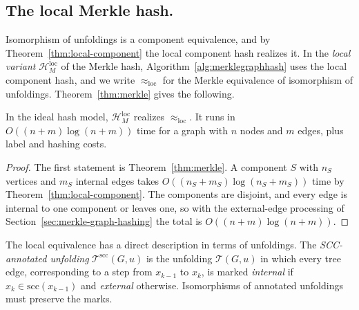 \documentclass[twoside,leqno]{article}
\newcommand{\HMl}{\mathcal{H}_{M}^{\mathrm{loc}}}
\newcommand{\eql}{\approx_{\mathrm{loc}}}
\newcommand{\UnfA}{\Unf^{\mathrm{scc}}}
\newcommand{\Scc}{\mathrm{scc}}
\newcommand{\Unf}{\mathcal{T}}
\begin{document}
\subsection{The local Merkle hash.}
\label{sec:local-merkle}
Isomorphism of unfoldings is a component equivalence, and by Theorem~\ref{thm:local-component} the local component hash realizes it. In the \emph{local variant} $\HMl$ of the Merkle hash, Algorithm~\ref{alg:merklegraphhash} uses the local component hash, and we write $\eql$ for the Merkle equivalence of isomorphism of unfoldings. Theorem~\ref{thm:merkle} gives the following.

\begin{cor}
\label{cor:merkle-local}
In the ideal hash model, $\HMl$ realizes $\eql$. It runs in $O((n+m)\log(n+m))$ time for a graph with $n$ nodes and $m$ edges, plus label and hashing costs.
\end{cor}
\begin{proof}
The first statement is Theorem~\ref{thm:merkle}. A component $S$ with $n_S$ vertices and $m_S$ internal edges takes $O((n_S+m_S)\log(n_S+m_S))$ time by Theorem~\ref{thm:local-component}. The components are disjoint, and every edge is internal to one component or leaves one, so with the external-edge processing of Section~\ref{sec:merkle-graph-hashing} the total is $O((n+m)\log(n+m))$.
\end{proof}

The local equivalence has a direct description in terms of unfoldings. The \emph{SCC-annotated unfolding} $\UnfA(G,u)$ is the unfolding $\Unf(G,u)$ in which every tree edge, corresponding to a step from $x_{k-1}$ to $x_k$, is marked \emph{internal} if $x_k\in \Scc(x_{k-1})$ and \emph{external} otherwise. Isomorphisms of annotated unfoldings must preserve the marks.
\end{document}
